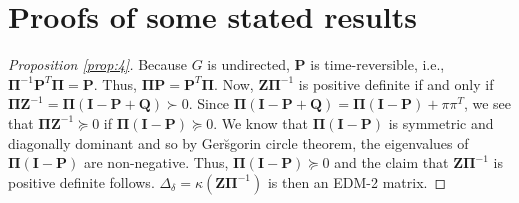 \documentclass[10pt,twocolumn]{article}
\numberwithin{equation}{section}
\begin{document}
\section{Proofs of some stated results}
\begin{proof}[Proposition \ref{prop:4}]
  Because $G$ is undirected, $\mathbf{P}$ is time-reversible, i.e.,
  $\bm{\Pi}^{-1} \mathbf{P}^{T} \bm{\Pi} = \mathbf{P}$. Thus,
  $\bm{\Pi}\mathbf{P} = \mathbf{P}^{T}\bm{\Pi}$. Now,
  $\mathbf{Z}\bm{\Pi}^{-1}$ is positive definite if and only if
  $\bm{\Pi}\mathbf{Z}^{-1} = \bm{\Pi}(\mathbf{I} - \mathbf{P} +
  \mathbf{Q}) \succ 0$. Since $\bm{\Pi}(\mathbf{I} - \mathbf{P} +
  \mathbf{Q}) = \bm{\Pi}(\mathbf{I} - \mathbf{P}) + \pi\pi^{T}$, we
  see that $\bm{\Pi}\mathbf{Z}^{-1} \succeq 0$ if $\bm{\Pi}(\mathbf{I}
  - \mathbf{P}) \succeq 0$. We know that $\bm{\Pi}(\mathbf{I} -
  \mathbf{P})$ is symmetric and diagonally dominant and so by
  Ger\u{s}gorin circle theorem, the eigenvalues of
  $\bm{\Pi}(\mathbf{I} - \mathbf{P})$ are non-negative. Thus,
  $\bm{\Pi}(\mathbf{I} - \mathbf{P}) \succeq 0$ and the claim that
  $\mathbf{Z}\bm{\Pi}^{-1}$ is positive definite
  follows. $\Delta_{\delta} = \kappa(\mathbf{Z}\bm{\Pi}^{-1})$ is then
  an EDM-2 matrix.
\end{proof}
\end{document}
